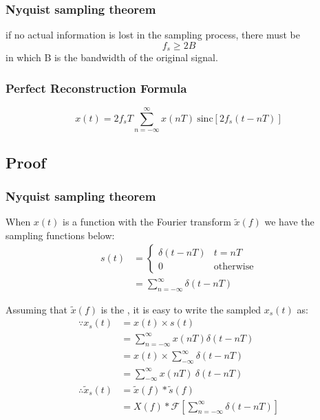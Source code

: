 \documentclass{article}
\begin{document}
\subsubsection*{Nyquist sampling theorem}

if no actual information is lost in the sampling process, there must be
\begin{equation} f_s \geq 2B
\end{equation} in which B is the bandwidth of the original signal.

\subsubsection*{Perfect Reconstruction Formula}
\begin{equation} x(t) = 2f_s T \sum_{n = -\infty}^{\infty} x(nT) ~ \mathrm{sinc} \left[ 2f_s(t - nT) \right]
\end{equation}
\subsection{Proof}
\subsubsection*{Nyquist sampling theorem}

When $x(t)$ is a function with the Fourier transform $\widetilde{x}(f)$ we have the sampling functions below:
\begin{align} s(t) & =
    \left\{
    \begin{array}{lr}
        \delta(t - nT) & t = nT             \\ 
        0              & \mathrm{otherwise}
    \end{array}
    \right. \nonumber                                   \\
         & = \sum_{n = -\infty}^{\infty} \delta(t - nT)
\end{align}

Assuming that $\widetilde{x}(f)$ is the , it is easy to write the sampled $x_s(t)$ as:
\begin{align}
    \because x_s(t)               & = x(t)\times s
     (t) \nonumber                                    \\
                                  & = \sum_{n = -\infty}^{\infty} x(nT) \delta(t - nT) \label{xst} \\
    &= x(t) \times \sum_{-\infty}^{\infty} \delta(t - nT)\\
    &=  \sum_{-\infty}^{\infty} x(nT)~\delta(t - nT)\\ 
    \therefore \widetilde{x}_s(t) & = \widetilde{x}(f) * \widetilde{s}(f) \label{xn} \\
    &= X(f) * \mathcal{F}\left[\sum_{n = -\infty}^{\infty} \delta
       (t - nT)\right]
\end{align}
\end{document}
